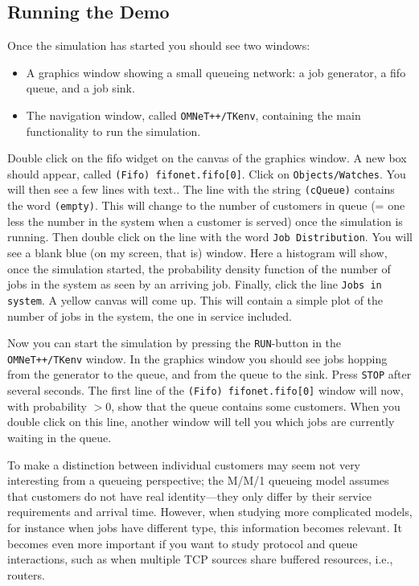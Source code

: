 \documentclass[a4paper]{article}
\begin{document}
\subsection{Running the Demo}
\label{sec:running-simulation}
Once the simulation has started you should see two windows:
\begin{itemize}
\item A graphics window showing a small queueing network: a job
  generator, a fifo queue, and a job sink.
\item The navigation window, called \texttt{OMNeT++/TKenv}, containing
  the main functionality to run the simulation.
\end{itemize}

Double click on the fifo widget on the canvas of the graphics window.
A new box should appear, called \texttt{(Fifo) fifonet.fifo[0]}. Click
on \texttt{Objects/Watches}.  You will then see a few lines with
text.. The line with the string \texttt{(cQueue)} contains the word
\texttt{(empty)}.  This will change to the number of customers in
queue (= one less the number in the system when a customer is served)
once the simulation is running.  Then double click on the line with
the word \texttt{Job Distribution}.  You will see a blank blue (on my
screen, that is) window. Here a histogram will show, once the
simulation started, the probability density function of the number of
jobs in the system as seen by an arriving job. Finally, click the line
\texttt{Jobs in system}. A yellow canvas will come up. This will
contain a simple plot of the number of jobs in the system, the one in
service included.

Now you can start the simulation by pressing the \texttt{RUN}-button
in the \texttt{OMNeT++/TKenv} window. In the graphics window you
should see jobs hopping from the generator to the queue, and from the
queue to the sink.  Press \texttt{STOP} after several seconds. The
first line of the \texttt{(Fifo) fifonet.fifo[0]} window will now,
with probability $ > 0$, show that the queue contains some customers.
When you double click on this line, another window will tell you which
jobs are currently waiting in the queue.

To make a distinction between individual customers may seem not very
interesting from a queueing perspective; the M/M/1 queueing model
assumes that customers do not have real identity---they only differ by
their service requirements and arrival time. However, when studying
more complicated models, for instance when jobs have different type,
this information becomes relevant. It becomes even more important if
you want to study protocol and queue interactions, such as when
multiple TCP sources share buffered resources, i.e., routers.
\end{document}

